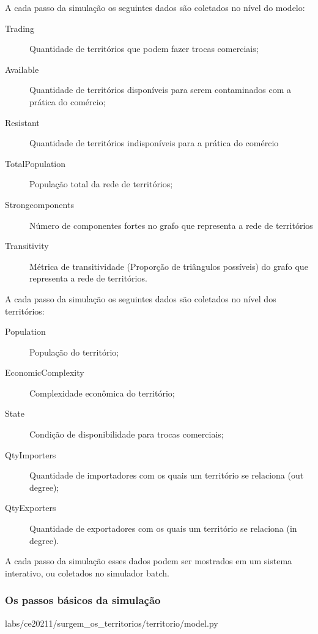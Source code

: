 A cada passo da simulação os seguintes dados são coletados no nível do modelo:
\begin{description}
\item [Trading] Quantidade de territórios que podem fazer trocas comerciais;
\item [Available] Quantidade de territórios disponíveis para serem contaminados com a prática do comércio;
\item [Resistant] Quantidade de territórios indisponíveis para a prática do comércio
\item [TotalPopulation] População total da rede de territórios;
\item [Strongcomponents] Número de componentes fortes no grafo que representa a rede de territórios
\item [Transitivity] Métrica de transitividade (Proporção de triângulos possíveis) do grafo que representa a rede de territórios.
\end{description}

A cada passo da simulação os seguintes dados são coletados no nível dos territórios:
\begin{description}
\item [Population] População do território;
\item [EconomicComplexity] Complexidade econômica do território;
\item [State] Condição de disponibilidade para trocas comerciais;
\item [QtyImporters] Quantidade de importadores com os quais um território se relaciona (out degree);
\item [QtyExporters] Quantidade de exportadores com os quais um território se relaciona (in degree).
\end{description}

A cada passo da simulação esses dados podem ser mostrados em um sistema interativo, ou coletados 
no simulador batch.

\subsubsection{Os passos básicos da simulação}


{labs/ce20211/surgem_os_territorios/territorio/model.py}

